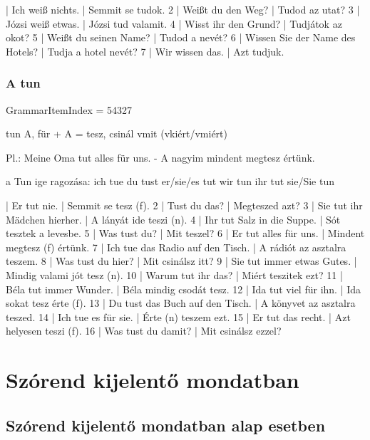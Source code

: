 \documentclass{article}
\newenvironment{desc}{\verbatim}{\endverbatim}
\newenvironment{exmp}{\verbatim}{\endverbatim}
\begin{document}
\begin{exmp}
1 | Ich weiß nichts. | Semmit se tudok.
2 | Weißt du den Weg? | Tudod az utat?
3 | Józsi weiß etwas. | Józsi tud valamit.
4 | Wisst ihr den Grund? | Tudjátok az okot?
5 | Weißt du seinen Name? | Tudod a nevét?
6 | Wissen Sie der Name des Hotels? | Tudja a hotel nevét?
7 | Wir wissen das. | Azt tudjuk.
\end{exmp}

\subsubsection{A tun}

GrammarItemIndex = 54327

\begin{desc}
tun A, für + A = tesz, csinál vmit (vkiért/vmiért)

Pl.: Meine Oma tut alles für uns. - A nagyim mindent megtesz értünk.

a Tun ige ragozása:
ich tue
du tust
er/sie/es tut
wir tun
ihr tut
sie/Sie tun
\end{desc}

\begin{exmp}
1 | Er tut nie. | Semmit se tesz (f).
2 | Tust du das? | Megteszed azt?
3 | Sie tut ihr Mädchen hierher. | A lányát ide teszi (n).
4 | Ihr tut Salz in die Suppe. | Sót tesztek a levesbe.
5 | Was tust du? | Mit teszel?
6 | Er tut alles für uns. | Mindent megtesz (f) értünk.
7 | Ich tue das Radio auf den Tisch. | A rádiót az asztalra teszem.
8 | Was tust du hier? | Mit csinálsz itt?
9 | Sie tut immer etwas Gutes. | Mindig valami jót tesz (n).
10 | Warum tut ihr das? | Miért teszitek ezt?
11 | Béla tut immer Wunder. | Béla mindig csodát tesz.
12 | Ida tut viel für ihn. | Ida sokat tesz érte (f).
13 | Du tust das Buch auf den Tisch. | A könyvet az asztalra teszed.
14 | Ich tue es für sie. | Érte (n) teszem ezt.
15 | Er tut das recht. | Azt helyesen teszi (f).
16 | Was tust du damit? | Mit csinálsz ezzel?
\end{exmp}

\section{Szórend kijelentő mondatban}

\subsection{Szórend kijelentő mondatban alap esetben}
\end{document}
